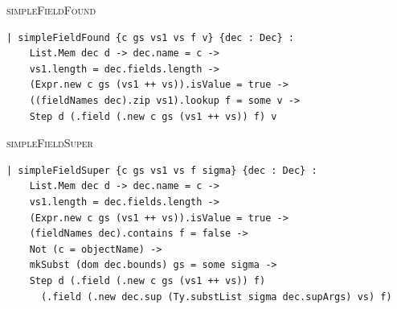 \begin{cmp}{\textsc{simpleFieldFound}}
\begin{paperside}
\end{paperside}
\begin{leanside}
\begin{lstlisting}[style=leanside]
| simpleFieldFound {c gs vs1 vs f v} {dec : Dec} :
    List.Mem dec d -> dec.name = c ->
    vs1.length = dec.fields.length ->
    (Expr.new c gs (vs1 ++ vs)).isValue = true ->
    ((fieldNames dec).zip vs1).lookup f = some v ->
    Step d (.field (.new c gs (vs1 ++ vs)) f) v
\end{lstlisting}
\end{leanside}
\end{cmp}

\begin{cmp}{\textsc{simpleFieldSuper}}
\begin{paperside}
\end{paperside}
\begin{leanside}
\begin{lstlisting}[style=leanside]
| simpleFieldSuper {c gs vs1 vs f sigma} {dec : Dec} :
    List.Mem dec d -> dec.name = c ->
    vs1.length = dec.fields.length ->
    (Expr.new c gs (vs1 ++ vs)).isValue = true ->
    (fieldNames dec).contains f = false ->
    Not (c = objectName) ->
    mkSubst (dom dec.bounds) gs = some sigma ->
    Step d (.field (.new c gs (vs1 ++ vs)) f)
      (.field (.new dec.sup (Ty.substList sigma dec.supArgs) vs) f)
\end{lstlisting}
\end{leanside}
\end{cmp}

